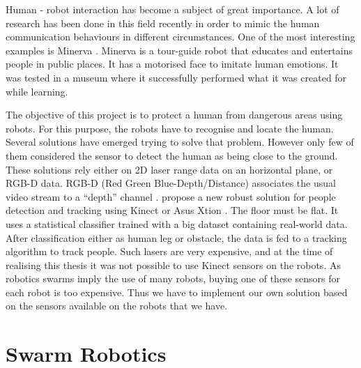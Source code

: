\documentclass[oneside, a4paper, 12pt]{memoir}
\begin{document}
		Human - robot interaction has become a subject of great importance. A lot of research has been done in this field recently in order to mimic the human communication behaviours in different circumstances. One of the most interesting examples is Minerva \citep{thrun1999minerva}. Minerva is a tour-guide robot that educates and entertains people in public places. It has a motorised face to imitate human emotions. It was tested in a museum where it successfully performed what it was created for while learning.
		
		The objective of this project is to protect a human from dangerous areas using robots. For this purpose, the robots have to recognise and locate the human. Several solutions have emerged trying to solve that problem. However only few of them considered the sensor to detect the human as being close to the ground. These solutions rely either on 2D laser range data on an horizontal plane, or RGB-D data. RGB-D (Red Green Blue-Depth/Distance) associates the usual video stream to a \enquote{depth} channel \citep{wiki:004}. \citet{gritti2014kinect} propose a new robust solution for people detection and tracking using Kinect \citep{kinect} or Asus Xtion \citep{asus}. The floor must be flat. It uses a statistical classifier trained with a big dataset containing real-world data. After classification either as human leg or obstacle, the data is fed to a tracking algorithm to track people. Such lasers are very expensive, and at the time of realising this thesis it was not possible to use Kinect sensors on the robots. As robotics swarms imply the use of many robots, buying one of these sensors for each robot is too expensive. Thus we have to implement our own solution based on the sensors available on the robots that we have.
		
	\section{Swarm Robotics}

	
\end{document}
